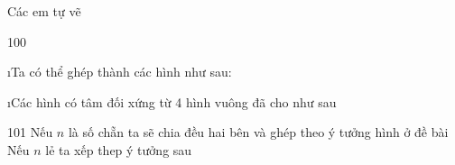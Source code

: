 \begin{Answer}{99}
		Các em tự vẽ
	
\end{Answer}
\begin{Answer}{100}
		\begin{enumerate}[a), leftmargin=*]
			\i Ta có thể ghép thành các hình như sau:

			\i Các hình có tâm đối xứng từ 4 hình vuông đã cho như sau
			
		\end{enumerate}		
	
\end{Answer}
\begin{Answer}{101}
		Nếu $n$ là số chẵn ta sẽ chia đều hai bên và ghép theo ý tưởng hình ở đề bài
		Nếu $n$ lẻ ta xếp thep ý tưởng sau
	
\end{Answer}
